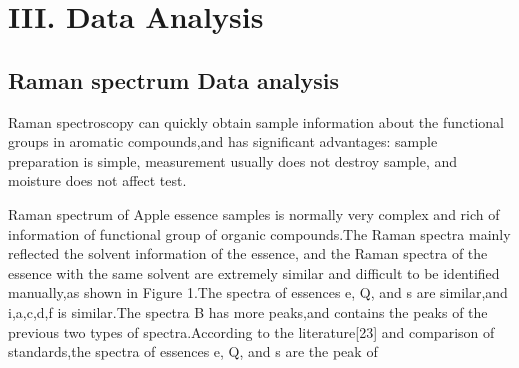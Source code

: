\documentclass[a4paper]{article}
\begin{document}
\section{III. Data Analysis}
\subsection{Raman spectrum Data analysis}
Raman spectroscopy can quickly obtain sample information about the functional groups in aromatic compounds,and has significant advantages: sample preparation is simple, measurement usually does not destroy sample, and moisture does not affect test.

Raman spectrum of Apple essence samples is normally very complex and rich of information of functional group of organic compounds.The Raman spectra mainly reflected the solvent information of the essence, and the Raman spectra of the essence with the same solvent are extremely similar and difficult to be identified manually,as shown in Figure 1.The spectra of essences e, Q, and s are similar,and i,a,c,d,f is similar.The spectra B has more peaks,and contains the peaks of the previous two types of spectra.According to the literature[23] and comparison of standards,the spectra of essences e, Q, and s are the peak of

\end{document}
